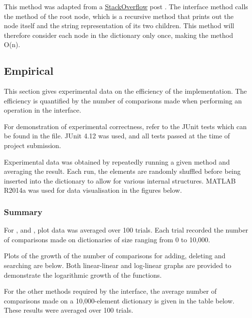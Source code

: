 \subsubsection{}
This method was adapted from a \href{http://stackoverflow.com/}{StackOverflow} post \cite{stackoverflow}. The interface method  calls the  method of the root node, which is a recursive method that prints out the node itself and the string representation of its two children. This method will therefore consider each node in the dictionary only once, making the method O(n).

\subsection{Empirical}

This section gives experimental data on the efficiency of the implementation. The efficiency is quantified by the number of comparisons made when performing an operation in the  interface.

For demonstration of experimental correctness, refer to the JUnit tests which can be found in the  file. JUnit 4.12 was used, and all tests passed at the time of project submission.

Experimental data was obtained by repeatedly running a given method and averaging the result. Each run, the elements are randomly shuffled before being inserted into the dictionary to allow for various internal structures. MATLAB R2014a was used for data visualisation in the figures below.

\subsubsection{Summary}
For ,  and , plot data was averaged over 100 trials. Each trial recorded the number of comparisons made on dictionaries of size ranging from 0 to 10,000.

Plots of the growth of the number of comparisons for adding, deleting and searching are below. Both linear-linear and log-linear graphs are provided to demonstrate the logarithmic growth of the functions.

For the other methods required by the  interface, the average number of comparisons made on a 10,000-element dictionary is given in the table below. These results were averaged over 100 trials.

